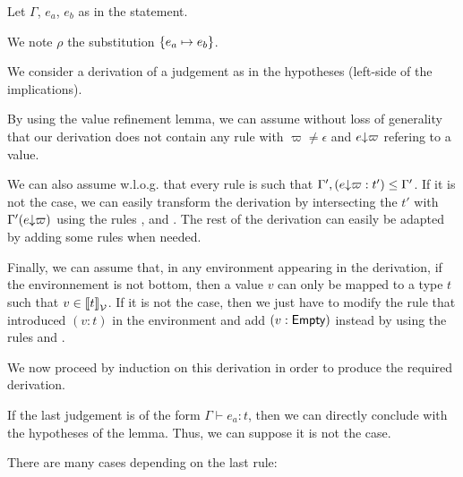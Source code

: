 \documentclass[a4paper]{article}
\theoremstyle{definition}
\begin{document}
        Let $\Gamma$, $e_a$, $e_b$ as in the statement.

        We note $\rho$ the substitution $\{e_a \mapsto e_b\}$.

        We consider a derivation of a judgement as in the hypotheses (left-side of the implications).

        By using the value refinement lemma, we can assume without loss of generality that our derivation does not contain
        any rule  with $\varpi\neq\epsilon$ and $e{\downarrow}\varpi$ refering to a value.

        We can also assume w.l.o.g. that every  rule is such that $\Gamma',(e{\downarrow}\varpi:t') \leq \Gamma'$. If it is not the case,
        we can easily transform the derivation by intersecting the $t'$ with $\Gamma'(e{\downarrow}\varpi)$
        using the rules ,  and .
        The rest of the derivation can easily be adapted by adding some  rules when needed.

        Finally, we can assume that, in any environment appearing in the derivation, if the environnement is not bottom,
        then a value $v$ can only be mapped to a type $t$ such that $v\in{\llbracket t \rrbracket}_{\mathcal{V}}$. If it is not the case, then we just have to modify the
         rule that introduced $(v:t)$ in the environment and add $(v:\textsf{Empty})$ instead by using the rules  and .

        We now proceed by induction on this derivation in order to produce the required derivation.
        
        If the last judgement is of the form $\Gamma \vdash e_a: t$, then we can directly conclude with the hypotheses of the lemma.
        Thus, we can suppose it is not the case.

        There are many cases depending on the last rule:
\end{document}
